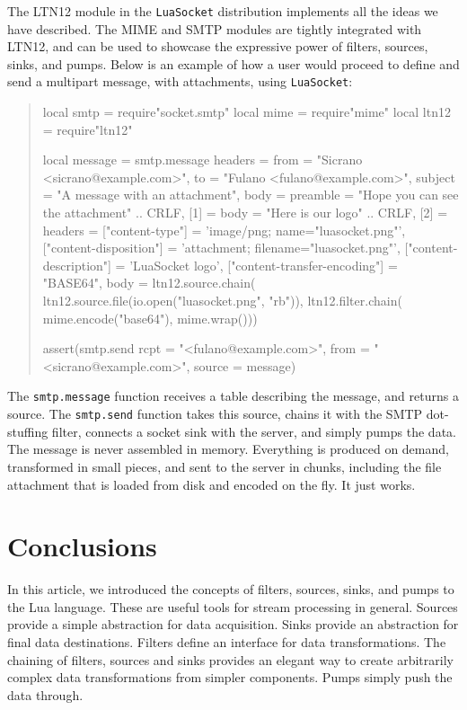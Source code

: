\documentclass[10pt]{article}
\begin{document}
The LTN12 module in the \texttt{LuaSocket} distribution
implements all the ideas we have described. The MIME
and SMTP modules are tightly integrated with LTN12, 
and can be used to showcase the expressive power of filters,
sources, sinks, and pumps. Below is an example 
of how a user would proceed to define and send a
multipart message, with attachments, using \texttt{LuaSocket}:
\begin{quote}
\begin{mime}
local smtp = require"socket.smtp"
local mime = require"mime"
local ltn12 = require"ltn12"

local message = smtp.message{
  headers = {
    from = "Sicrano <sicrano@example.com>",
    to = "Fulano <fulano@example.com>",
    subject = "A message with an attachment"},
  body = {
    preamble = "Hope you can see the attachment" .. CRLF,
    [1] = {
      body = "Here is our logo" .. CRLF},
    [2] = {
      headers = {
        ["content-type"] = 'image/png; name="luasocket.png"',
        ["content-disposition"] = 
          'attachment; filename="luasocket.png"',
        ["content-description"] = 'LuaSocket logo',
        ["content-transfer-encoding"] = "BASE64"},
      body = ltn12.source.chain(
        ltn12.source.file(io.open("luasocket.png", "rb")),
        ltn12.filter.chain(
          mime.encode("base64"),
          mime.wrap()))}}}

assert(smtp.send{
  rcpt = "<fulano@example.com>",
  from = "<sicrano@example.com>",
  source = message})
\end{mime}
\end{quote}

The \texttt{smtp.message} function receives a table
describing the message, and returns a source. The
\texttt{smtp.send} function takes this source, chains it with the
SMTP dot-stuffing filter, connects a socket sink
with the server, and simply pumps the data. The message is never 
assembled in memory.  Everything is produced on demand, 
transformed in small pieces, and sent to the server in chunks, 
including the file attachment that is loaded from disk and 
encoded on the fly. It just works.

\section{Conclusions}

In this article, we introduced the concepts of filters,
sources, sinks, and pumps to the Lua language. These are
useful tools for stream processing in general. Sources provide
a simple abstraction for data acquisition. Sinks provide an
abstraction for final data destinations. Filters define an
interface for data transformations.  The chaining of
filters, sources and sinks provides an elegant way to create
arbitrarily complex data transformations from simpler
components. Pumps simply push the data through.  
\end{document}
